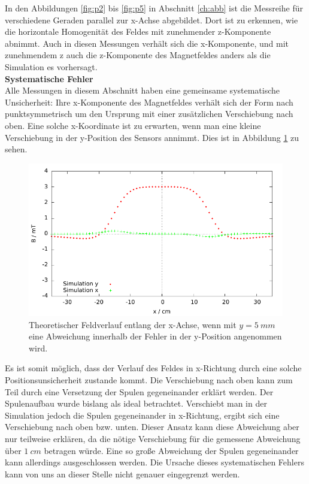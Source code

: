\documentclass[12pt,a4paper]{article}
\begin{document}
In den Abbildungen \ref{fig:p2} bis \ref{fig:p5} in Abschnitt \ref{ch:abb} ist die Messreihe für verschiedene Geraden parallel zur x-Achse abgebildet. Dort ist zu erkennen, wie die horizontale Homogenität des Feldes mit zunehmender z-Komponente abnimmt. Auch in diesen Messungen verhält sich die x-Komponente, und mit zunehmendem z auch die z-Komponente des Magnetfeldes anders als die Simulation es vorhersagt.\\

\noindent \textbf{Systematische Fehler}\\
Alle Messungen in diesem Abschnitt haben eine gemeinsame systematische Unsicherheit: Ihre x-Komponente des Magnetfeldes verhält sich der Form nach punktsymmetrisch um den Ursprung mit einer zusätzlichen Verschiebung nach oben. Eine solche x-Koordinate ist zu erwarten, wenn man eine kleine Verschiebung in der y-Position des Sensors annimmt. Dies ist in Abbildung \ref{plot0} zu sehen.
\begin{figure}[H]
	\centering
	\includegraphics[scale=0.9]{plot0.pdf}
	\caption{Theoretischer Feldverlauf entlang der x-Achse, wenn mit $y=\SI{5}{mm}$ eine Abweichung innerhalb der Fehler in der y-Position angenommen wird.}
	\label{plot0}
\end{figure}
Es ist somit möglich, dass der Verlauf des Feldes in x-Richtung durch eine solche Positionsunsicherheit zustande kommt. Die Verschiebung nach oben kann zum Teil durch eine Versetzung der Spulen gegeneinander erklärt werden. Der Spulenaufbau wurde bislang als ideal betrachtet. Verschiebt man in der Simulation jedoch die Spulen gegeneinander in x-Richtung, ergibt sich eine Verschiebung nach oben bzw. unten. Dieser Ansatz kann diese Abweichung aber nur teilweise erklären, da die nötige Verschiebung für die gemessene Abweichung über $\SI{1}{cm}$ betragen würde. Eine so große Abweichung der Spulen gegeneinander kann allerdings ausgeschlossen werden. Die Ursache dieses systematischen Fehlers kann von uns an dieser Stelle nicht genauer eingegrenzt werden.\\
\end{document}
